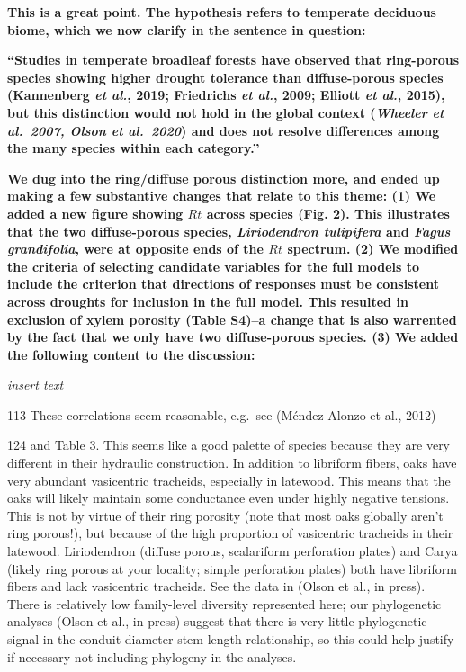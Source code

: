\documentclass[
]{article}
\begin{document}
\textbf{This is a great point. The hypothesis refers to temperate
deciduous biome, which we now clarify in the sentence in question:}

\textbf{``Studies in temperate broadleaf forests have observed that
ring-porous species showing higher drought tolerance than diffuse-porous
species (Kannenberg \emph{et al.}, 2019; Friedrichs \emph{et al.}, 2009;
Elliott \emph{et al.}, 2015), but this distinction would not hold in the
global context (\emph{Wheeler et al.~2007, Olson et al.~2020}) and does
not resolve differences among the many species within each category.''}

\textbf{We dug into the ring/diffuse porous distinction more, and ended
up making a few substantive changes that relate to this theme: (1) We
added a new figure showing \(Rt\) across species (Fig. 2). This
illustrates that the two diffuse-porous species, \emph{Liriodendron
tulipifera} and \emph{Fagus grandifolia}, were at opposite ends of the
\(Rt\) spectrum. (2) We modified the criteria of selecting candidate
variables for the full models to include the criterion that directions
of responses must be consistent across droughts for inclusion in the
full model. This resulted in exclusion of xylem porosity (Table S4)--a
change that is also warrented by the fact that we only have two
diffuse-porous species. (3) We added the following content to the
discussion: }

\emph{insert text}

113 These correlations seem reasonable, e.g.~see (Méndez-Alonzo et al.,
2012)

124 and Table 3. This seems like a good palette of species because they
are very different in their hydraulic construction. In addition to
libriform fibers, oaks have very abundant vasicentric tracheids,
especially in latewood. This means that the oaks will likely maintain
some conductance even under highly negative tensions. This is not by
virtue of their ring porosity (note that most oaks globally aren't ring
porous!), but because of the high proportion of vasicentric tracheids in
their latewood. Liriodendron (diffuse porous, scalariform perforation
plates) and Carya (likely ring porous at your locality; simple
perforation plates) both have libriform fibers and lack vasicentric
tracheids. See the data in (Olson et al., in press). There is relatively
low family-level diversity represented here; our phylogenetic analyses
(Olson et al., in press) suggest that there is very little phylogenetic
signal in the conduit diameter-stem length relationship, so this could
help justify if necessary not including phylogeny in the analyses.
\end{document}
